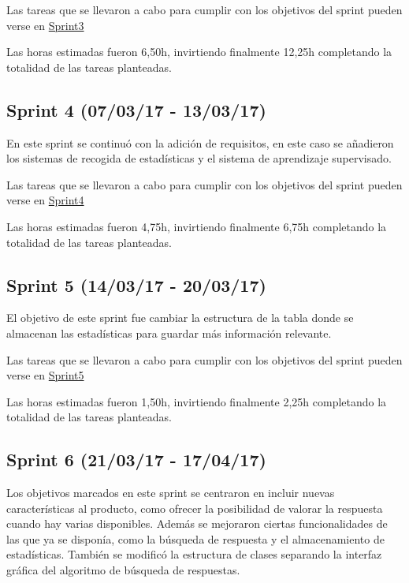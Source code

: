 Las tareas que se llevaron a cabo para cumplir con los objetivos del sprint pueden verse en \href{https://github.com/DanielSantidrian/UBUassistant/milestone/6?closed=1}{Sprint3}

Las horas estimadas fueron 6,50h, invirtiendo finalmente 12,25h completando la totalidad de las tareas planteadas.


\subsection{Sprint 4 (07/03/17 - 13/03/17)}

En este sprint se continuó con la adición de requisitos, en este caso se añadieron los sistemas de recogida de estadísticas y el sistema de aprendizaje supervisado.

Las tareas que se llevaron a cabo para cumplir con los objetivos del sprint pueden verse en \href{https://github.com/DanielSantidrian/UBUassistant/milestone/7?closed=1}{Sprint4}

Las horas estimadas fueron 4,75h, invirtiendo finalmente 6,75h completando la totalidad de las tareas planteadas.


\subsection{Sprint 5 (14/03/17 - 20/03/17)}

El objetivo de este sprint fue cambiar la estructura de la tabla donde se almacenan las estadísticas para guardar más información relevante.

Las tareas que se llevaron a cabo para cumplir con los objetivos del sprint pueden verse en \href{https://github.com/DanielSantidrian/UBUassistant/milestone/8?closed=1}{Sprint5}

Las horas estimadas fueron 1,50h, invirtiendo finalmente 2,25h completando la totalidad de las tareas planteadas.


\subsection{Sprint 6 (21/03/17 - 17/04/17)}

Los objetivos marcados en este sprint se centraron en incluir nuevas características al producto, como ofrecer la posibilidad de valorar la respuesta cuando hay varias disponibles. Además se mejoraron ciertas funcionalidades de las que ya se disponía, como la búsqueda de respuesta y el almacenamiento de estadísticas. También se modificó la estructura de clases separando la interfaz gráfica del algoritmo de búsqueda de respuestas.


